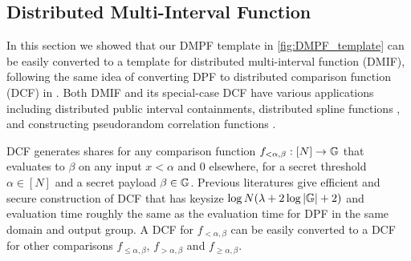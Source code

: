 \iffalse
\begin{remark}
    One may also hope for an efficient distributed key generation for the PBC-based DMPF, since its $\Gen$ just contains PBC encoding followed by different DPFs. However the PBC encoding, e.g., instantiated by cuckoo hashing, requires random access among $\Omega(t)$ elements, where $t$ is the number of the DMPF accepting inputs, and the RAM model is not for free. \Yaxin{`RAM model is not for free' is just my impression. Please directly edit it if people could make it more rigorous. }
\end{remark}
\fi

\subsection{Distributed Multi-Interval Function}
In this section we showed that our DMPF template in \cref{fig:DMPF_template} can be easily converted to a template for distributed multi-interval function (DMIF), following the same idea of converting DPF to distributed comparison function (DCF) in \cite{10.1007/978-3-662-46803-6_12,BoyGilIsh16}. Both DMIF and its special-case DCF have various applications including distributed public interval containments, distributed spline functions \cite{cryptoeprint:2020/1392,cryptoeprint:2019/1095}, and constructing pseudorandom correlation functions \cite{cryptoeprint:2022/1014}. 

DCF generates shares for any comparison function $f_{<\alpha, \beta}:[N]\rightarrow \mathbb{G}$ that evaluates to $\beta$ on any input $x<\alpha$ and 0 elsewhere, for a secret threshold $\alpha\in[N]$ and a secret payload $\beta\in \mathbb{G}$. Previous literatures give efficient and secure construction of DCF that has keysize $\log N(\lambda+2\log |\mathbb{G}|+2)$ and evaluation time roughly the same as the evaluation time for DPF in the same domain and output group. A DCF for $f_{<\alpha, \beta}$ can be easily converted to a DCF for other comparisons $f_{\le \alpha, \beta}$, $f_{>\alpha,\beta}$ and $f_{\ge \alpha,\beta}$. 

